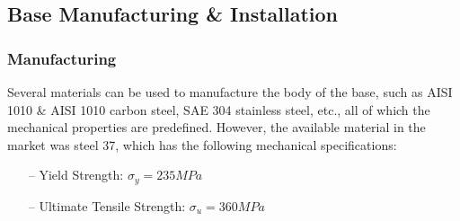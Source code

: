 \newpage

\subsection{Base Manufacturing \& Installation }

\subsubsection{Manufacturing}

Several materials can be used to manufacture the body of the base, such as AISI 1010 \& AISI 1010 carbon steel, SAE 304 stainless steel, etc., all of which the mechanical properties are predefined. However, the available material in the market was steel 37, which has the following mechanical specifications:

\begin{itemize}
	\item[--] Yield Strength: $\sigma_{y} = 235 MPa$
	\item[--] Ultimate Tensile Strength: $\sigma_{u} = 360 MPa$
\end{itemize}


